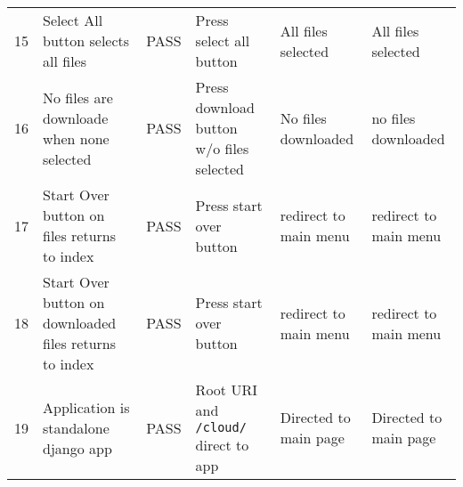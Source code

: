 \documentclass{article}
\begin{document}
\begin{landscape}
\begin{center}
\begin{tabular}{|l|l|l|l|l|l|}
      15 & Select All button selects all files & PASS & Press select all button & All files selected & All files selected \\
      16 & No files are downloade when none selected & PASS & Press download button w/o files selected & No files downloaded & no files downloaded \\
      17 & Start Over button on files returns to index & PASS & Press start over button & redirect to main menu & redirect to main menu \\
      18 & Start Over button on downloaded files returns to index & PASS & Press start over button & redirect to main menu & redirect to main menu \\
      19 & Application is standalone django app & PASS & Root URI and \texttt{/cloud/} direct to app & Directed to main page & Directed to main page \\
      \hline

      \hline
    \end{tabular}
    \end{center}
    \end{landscape}
\end{document}
